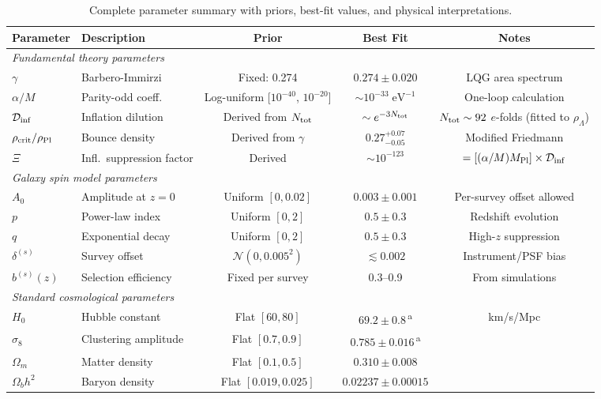 \documentclass[aps,prd,twocolumn,superscriptaddress,showpacs,preprintnumbers,nofootinbib,longbibliography,floatfix]{revtex4-2}
\newcommand{\Dinf}{\mathcal{D}_{\rm inf}}
\newcommand{\rhocrit}{\rho_{\rm crit}}
\newcommand{\rhoPl}{\rho_{\rm Pl}}
\newcommand{\MPl}{M_{\rm Pl}}
\begin{document}
\begin{table}[t]
\caption{\label{tab:params}\label{tab:priors} Complete parameter summary with priors, best-fit values, and physical interpretations.}
\begin{ruledtabular}
\begin{tabular}{llccc}
Parameter & Description & Prior & Best Fit & Notes \\
\hline
\multicolumn{5}{l}{\textit{Fundamental theory parameters}} \\
$\gamma$ & Barbero-Immirzi & Fixed: 0.274 & $0.274\pm 0.020$ & LQG area spectrum \\
$\alpha/M$ & Parity-odd coeff. & Log-uniform [$10^{-40}$, $10^{-20}$] & $\sim 10^{-33}\;\text{eV}^{-1}$ & One-loop calculation \\
$\Dinf$ & Inflation dilution & Derived from $N_{\rm tot}$ & $\sim e^{-3N_{\rm tot}}$ & $N_{\rm tot}\sim 92$ $e$-folds (fitted to $\rho_\Lambda$) \\
$\rhocrit/\rhoPl$ & Bounce density & Derived from $\gamma$ & $0.27^{+0.07}_{-0.05}$ & Modified Friedmann \\
$\Xi$ & Infl.\ suppression factor & Derived & $\sim 10^{-123}$ & $= [(\alpha/M)\MPl]\times\Dinf$ \\
\hline
\multicolumn{5}{l}{\textit{Galaxy spin model parameters}} \\
$A_0$ & Amplitude at $z=0$ & Uniform $[0,0.02]$ & $0.003\pm 0.001$ & Per-survey offset allowed \\
$p$ & Power-law index & Uniform $[0,2]$ & $0.5\pm 0.3$ & Redshift evolution \\
$q$ & Exponential decay & Uniform $[0,2]$ & $0.5\pm 0.3$ & High-$z$ suppression \\
$\delta^{(s)}$ & Survey offset & $\mathcal{N}(0,0.005^2)$ & $\lesssim 0.002$ & Instrument/PSF bias \\
$b^{(s)}(z)$ & Selection efficiency & Fixed per survey & 0.3--0.9 & From simulations \\
\hline
\multicolumn{5}{l}{\textit{Standard cosmological parameters}} \\
$H_0$ & Hubble constant & Flat $[60,80]$ & $69.2\pm 0.8$\,\textsuperscript{a} & km/s/Mpc \\
$\sigma_8$ & Clustering amplitude & Flat $[0.7,0.9]$ & $0.785\pm 0.016$\,\textsuperscript{a} & \\
$\Omega_m$ & Matter density & Flat $[0.1,0.5]$ & $0.310 \pm 0.008$ & \\
$\Omega_b h^2$ & Baryon density & Flat $[0.019,0.025]$ & $0.02237 \pm 0.00015$ & \\

\end{tabular}
\end{ruledtabular}
\end{table}
\end{document}
